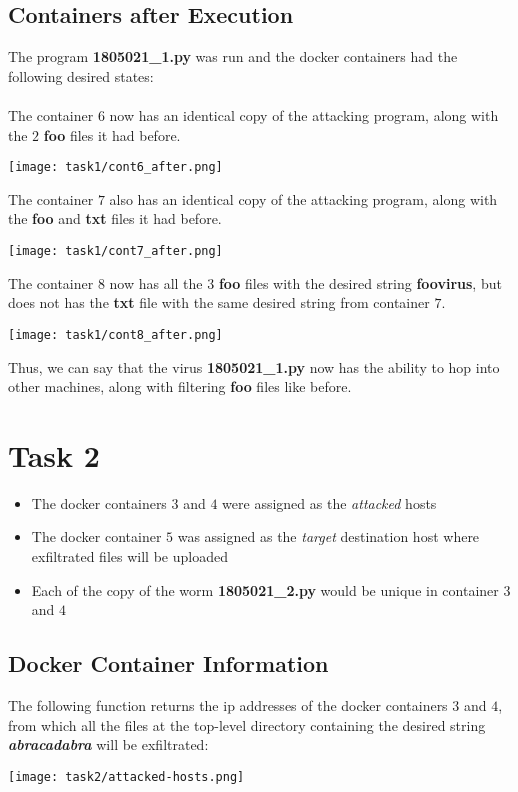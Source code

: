\documentclass{article}
\begin{document}
\subsection{Containers after Execution}
The program \textbf{1805021\_1.py} was run and the docker containers had the following desired states:\\\\

The container $6$ now has an identical copy of the attacking program, along with the $2$ \textbf{foo} files it had before. 
\begin{center}
    \texttt{[image: task1/cont6\_after.png]}
\end{center}

The container $7$ also has an identical copy of the attacking program, along with the \textbf{foo} and \textbf{txt} files it had before. 
\begin{center}
    \texttt{[image: task1/cont7\_after.png]}
\end{center}

The container $8$ now has all the $3$ \textbf{foo} files with the desired string \textbf{foovirus}, but does not has the \textbf{txt} file with the same desired string from container $7$.
\begin{center}
    \texttt{[image: task1/cont8\_after.png]}
\end{center}

Thus, we can say that the virus \textbf{1805021\_1.py} now has the ability to hop into other machines, along with filtering \textbf{foo} files like before.


 \section{Task 2}
 \begin{itemize}
     \item The docker containers $3$ and $4$ were assigned as the \textit{attacked} hosts
     \item The docker container $5$ was assigned as the \textit{target} destination host where exfiltrated files will be uploaded
     \item Each of the copy of the worm \textbf{1805021\_2.py} would be unique in container $3$ and $4$
 \end{itemize}

 \subsection{Docker Container Information}
 The following function returns the ip addresses of the docker containers $3$ and $4$, from which all the files at the top-level directory containing the desired string \textbf{\textit{abracadabra}} will be exfiltrated:
\begin{center}
    \texttt{[image: task2/attacked-hosts.png]}
\end{center}
\end{document}
